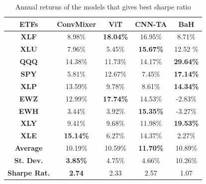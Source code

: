 \documentclass[]{article}
\begin{document}
\begin{table}[H]
\centering
 \begin{tabular}{c c c c c} 
 \hline
\textbf{ETFs} & \textbf{ConvMixer} & \textbf{ViT} & \textbf{CNN-TA} & \textbf{BaH} \\ [0.5ex] 
 \hline\hline
\textbf{XLF} & 8.98\% & \textbf{18.04\%} & 16.95\% & 8.71\% \\
 \hline
\textbf{XLU} & 7.96\% & 5.45\% & \textbf{15.67\%} & 12.52 \% \\
 \hline
\textbf{QQQ} & 14.38\% & 11.73\% & 14.17\% & \textbf{29.64\%} \\
 \hline
\textbf{SPY} & 5.81\% & 12.67\% & 7.45\% & \textbf{17.14\%} \\
 \hline
\textbf{XLP} & 13.59\% & 9.78\% & 8.61\% & \textbf{14.34\%} \\
 \hline
\textbf{EWZ} & 12.99\% & \textbf{17.74\%} & 14.53\% & -2.83\% \\
 \hline
\textbf{EWH} & 3.44\% & 3.92\% & \textbf{15.35\%} & -3.27\% \\
 \hline
\textbf{XLY} & 9.41\% & 9.68\% & 11.98\% & \textbf{19.53\%} \\
 \hline
\textbf{XLE} & \textbf{15.14\%} & 6.27\% & 14.37\% & 2.27\% \\
 \hline
\textbf{Average} & 10.19\% & 10.59\% & \textbf{11.70\%} & 10.89\% \\
 \hline
\textbf{St. Dev.} & \textbf{3.85\%} & 4.75\% & 4.66\% & 10.26\% \\
 \hline
\textbf{Sharpe Rat.} & \textbf{2.74} & 2.33 & 2.57 & 1.07 \\
 \hline
 \end{tabular}
 \caption{Annual returns of the models that gives best sharpe ratio}
\end{table}
\end{document}
